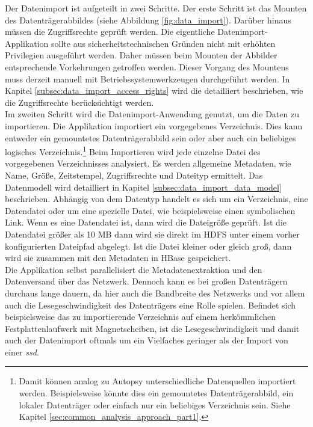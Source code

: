\noindent
Der Datenimport ist aufgeteilt in zwei Schritte. Der erste Schritt ist das Mounten des Datenträgerabbildes (siehe Abbildung \ref{fig:data_import}). Darüber hinaus müssen die Zugriffsrechte geprüft werden. Die eigentliche Datenimport-Applikation sollte aus sicherheitstechnischen Gründen nicht mit erhöhten Privilegien ausgeführt werden. Daher müssen beim Mounten der Abbilder entsprechende Vorkehrungen getroffen werden. Dieser Vorgang des Mountens muss derzeit manuell mit Betriebssystemwerkzeugen durchgeführt werden. In Kapitel \ref{subsec:data_import_access_rights} wird die detailliert beschrieben, wie die Zugriffsrechte berücksichtigt werden.\\

\noindent
Im zweiten Schritt wird die Datenimport-Anwendung genutzt, um die Daten zu importieren. 
Die Applikation importiert ein vorgegebenes Verzeichnis. Dies kann entweder ein gemountetes Datenträgerabbild sein oder aber auch ein beliebiges logisches Verzeichnis.\footnote{Damit können analog zu Autopsy unterschiedliche Datenquellen importiert werden. Beispielsweise könnte dies ein gemountetes Datenträgerabbild, ein lokaler Datenträger oder einfach nur ein beliebiges Verzeichnis sein. Siehe Kapitel \ref{sec:common_analysis_approach_part1}.} 
Beim Importieren wird jede einzelne Datei des vorgegebenen Verzeichnisses analysiert. Es werden allgemeine Metadaten, wie Name, Größe, Zeitstempel, Zugriffsrechte und Dateityp ermittelt. Das Datenmodell wird detailliert in Kapitel \ref{subsec:data_import_data_model} beschrieben. 
Abhängig von dem Datentyp handelt es sich um ein Verzeichnis, eine Datendatei oder um eine spezielle Datei, wie beispielsweise einen symbolischen Link. Wenn es eine Datendatei ist, dann wird die Dateigröße geprüft. 
Ist die Datendatei größer als 10 MB dann wird sie direkt im HDFS unter einem vorher konfigurierten Dateipfad abgelegt. Ist die Datei kleiner oder gleich groß, dann wird sie zusammen mit den Metadaten in HBase gespeichert.\\
Die Applikation selbst parallelisiert die Metadatenextraktion und den Datenversand über das Netzwerk. Dennoch kann es bei großen Datenträgern durchaus lange dauern, da hier auch die Bandbreite des Netzwerks und vor allem auch die Lesegeschwindigkeit des Datenträgers eine Rolle spielen. 
Befindet sich beispielsweise das zu importierende Verzeichnis auf einem herkömmlichen Festplattenlaufwerk mit Magnetscheiben, ist die Lesegeschwindigkeit und damit auch der Datenimport oftmals um ein Vielfaches geringer als der Import von einer \textit{\gls{ssd}}.\\ 

